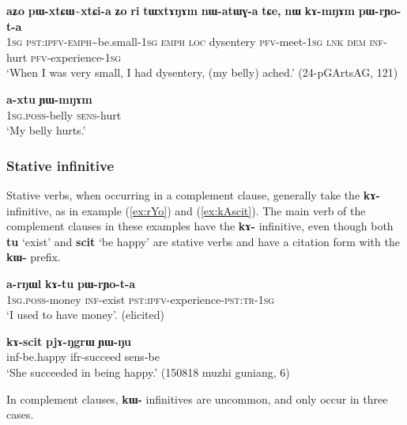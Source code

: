\documentclass[oneside,a4paper,11pt]{article}
\newcommand{\ipa}[1]{\textbf{\phon#1}} %
\newcommand{\jpg}[2]{\ipa{#1} `#2'} %
\newcommand{\tld}{\textasciitilde{}}
\begin{document}
 \begin{exe}
\ex \label{ex:kAmNAm}
\gll \ipa{aʑo} 	\ipa{pɯ-xtɕɯ\tld{}xtɕi-a} 	\ipa{ʑo} 	\ipa{ri} 	\ipa{tɯxtɤŋɤm} 	\ipa{nɯ-atɯɣ-a} 	\ipa{tɕe,} 	\ipa{nɯ} 	\ipa{kɤ-mŋɤm} 	\ipa{pɯ-rɲo-t-a} \\
\textsc{1sg} \textsc{pst:ipfv-emph}\tld{}be.small-\textsc{1sg} \textsc{emph} \textsc{loc} dysentery \textsc{pfv}-meet-\textsc{1sg} \textsc{lnk} \textsc{dem} \textsc{inf}-hurt \textsc{pfv}-experience-\textsc{1sg} \\
\glt `When I was very small, I had dysentery, (my belly) ached.'  (24-pGArtsAG, 121)
\end{exe}

 \begin{exe}
\ex \label{ex:YWmNAm}
\gll \ipa{a-xtu} 	\ipa{ɲɯ-mŋɤm} \\
\textsc{1sg.poss}-belly \textsc{sens}-hurt \\
\glt `My belly hurts.' 
\end{exe}


 
 \subsubsection{Stative infinitive} \label{sec:stative.inf}
Stative verbs, when occurring in a complement clause, generally take the \ipa{kɤ-} infinitive, as in example  (\ref{ex:rYo}) and (\ref{ex:kAscit}). The main verb of the complement clauses in these examples have the \ipa{kɤ-} infinitive, even though both \jpg{tu}{exist} and \jpg{scit}{be happy} are stative verbs and have a citation form with the \ipa{kɯ-} prefix.

\begin{exe}
\ex \label{ex:rYo}
\gll \ipa{a-rŋɯl} 	\ipa{kɤ-tu} 	\ipa{pɯ-rɲo-t-a} \\
\textsc{1sg.poss}-money \textsc{inf}-exist \textsc{pst:ipfv}-experience-\textsc{pst:tr-1sg} \\
\glt `I used to have money'. (elicited)
\end{exe}

\begin{exe}
\ex \label{ex:kAscit}
 \gll \ipa{kɤ-scit} 	\ipa{pjɤ-ŋgrɯ} 	\ipa{ɲɯ-ŋu}  \\
 inf-be.happy ifr-succeed sens-be \\
 \glt `She succeeded in being happy.' (150818 muzhi guniang, 6)
 \end{exe} 
 
In complement clauses, \ipa{kɯ-} infinitives are uncommon, and only occur in three cases.
 
\end{document}
